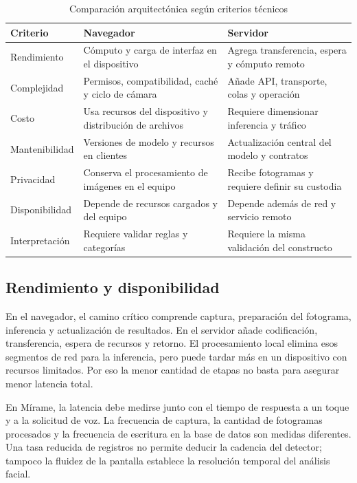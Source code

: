 \documentclass[conference,letterpaper]{IEEEtran}
\begin{document}
\begin{table}[ht]
\caption{Comparación arquitectónica según criterios técnicos}
\label{tab:comparacion}
\centering
\footnotesize
\setlength{\tabcolsep}{3pt}
\renewcommand{\arraystretch}{1.15}
\begin{tabularx}{\columnwidth}{|p{}|X|X|}\hline
Criterio & Navegador & Servidor \\ \hline
Rendimiento & Cómputo y carga de interfaz en el dispositivo & Agrega transferencia, espera y cómputo remoto \\ \hline
Complejidad & Permisos, compatibilidad, caché y ciclo de cámara & Añade API, transporte, colas y operación \\ \hline
Costo & Usa recursos del dispositivo y distribución de archivos & Requiere dimensionar inferencia y tráfico \\ \hline
Mantenibilidad & Versiones de modelo y recursos en clientes & Actualización central del modelo y contratos \\ \hline
Privacidad & Conserva el procesamiento de imágenes en el equipo & Recibe fotogramas y requiere definir su custodia \\ \hline
Disponibilidad & Depende de recursos cargados y del equipo & Depende además de red y servicio remoto \\ \hline
Interpretación & Requiere validar reglas y categorías & Requiere la misma validación del constructo \\ \hline
\end{tabularx}
\end{table}

\subsection{Rendimiento y disponibilidad}
En el navegador, el camino crítico comprende captura, preparación del fotograma, inferencia y actualización de resultados. En el servidor añade codificación, transferencia, espera de recursos y retorno. El procesamiento local elimina esos segmentos de red para la inferencia, pero puede tardar más en un dispositivo con recursos limitados. Por eso la menor cantidad de etapas no basta para asegurar menor latencia total.

En Mírame, la latencia debe medirse junto con el tiempo de respuesta a un toque y a la solicitud de voz. La frecuencia de captura, la cantidad de fotogramas procesados y la frecuencia de escritura en la base de datos son medidas diferentes. Una tasa reducida de registros no permite deducir la cadencia del detector; tampoco la fluidez de la pantalla establece la resolución temporal del análisis facial.
\end{document}
